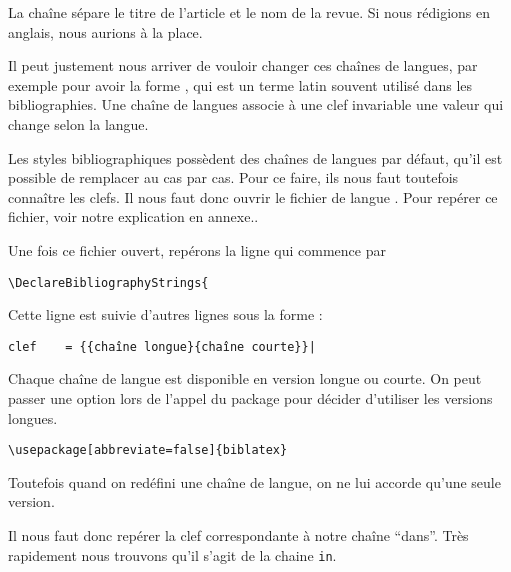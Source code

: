 	 
	 
	\begin{quotation}
		\cite{Junod1992}
	\end{quotation}
	
	La chaîne  sépare le titre de l'article et le nom de la revue. Si nous rédigions en anglais, nous aurions  à la place.  
	
	Il peut justement nous arriver de vouloir changer ces chaînes de langues, par exemple pour avoir la forme , qui est un terme latin souvent utilisé dans les bibliographies. Une chaîne de langues associe à une clef invariable une valeur qui change selon la langue.
	
	Les styles bibliographiques possèdent des chaînes de langues par défaut, qu'il est possible de remplacer au cas par cas. Pour ce faire, ils nous faut toutefois connaître les clefs. Il nous faut donc ouvrir le fichier de langue . Pour repérer ce fichier, voir notre explication en annexe..
	
	Une fois ce fichier ouvert, repérons la ligne qui commence par
	
	\begin{verbatim}
\DeclareBibliographyStrings{
	\end{verbatim}
	
	Cette ligne est suivie d'autres lignes sous la forme :
	
	\begin{verbatim}
clef	= {{chaîne longue}{chaîne courte}}|
	\end{verbatim}
	
	\begin{anedocte}
	Chaque chaîne de langue est disponible en version longue ou courte. On peut passer une option lors de l'appel du package  pour décider d'utiliser les versions longues.
	
	\begin{verbatim}
\usepackage[abbreviate=false]{biblatex}
	\end{verbatim}
	
	 Toutefois quand on redéfini une chaîne de langue, on ne lui accorde qu'une seule version.
	
		

	\end{anedocte}
	Il nous faut donc repérer la clef correspondante à notre chaîne \enquote{dans}. Très rapidement nous trouvons qu'il s'agit de la chaine \verb|in|.
	
